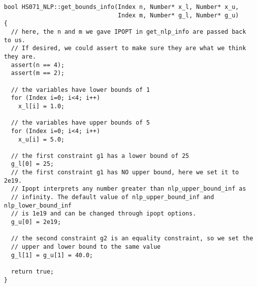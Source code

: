 \documentclass[10pt]{article}
\begin{document}
\begin{footnotesize}
\begin{verbatim}
bool HS071_NLP::get_bounds_info(Index n, Number* x_l, Number* x_u,
                                Index m, Number* g_l, Number* g_u)
{
  // here, the n and m we gave IPOPT in get_nlp_info are passed back to us.
  // If desired, we could assert to make sure they are what we think they are.
  assert(n == 4);
  assert(m == 2);

  // the variables have lower bounds of 1
  for (Index i=0; i<4; i++)
    x_l[i] = 1.0;

  // the variables have upper bounds of 5
  for (Index i=0; i<4; i++)
    x_u[i] = 5.0;

  // the first constraint g1 has a lower bound of 25
  g_l[0] = 25;
  // the first constraint g1 has NO upper bound, here we set it to 2e19.
  // Ipopt interprets any number greater than nlp_upper_bound_inf as 
  // infinity. The default value of nlp_upper_bound_inf and nlp_lower_bound_inf
  // is 1e19 and can be changed through ipopt options.
  g_u[0] = 2e19;

  // the second constraint g2 is an equality constraint, so we set the 
  // upper and lower bound to the same value
  g_l[1] = g_u[1] = 40.0;

  return true;
}
\end{verbatim}
\end{footnotesize}
\end{document}
